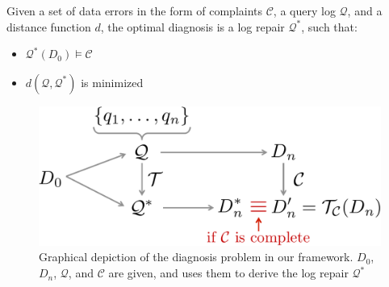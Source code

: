 \begin{definition}\label{def:problem}
    Given a set of data errors in the form of complaints $\mathcal{C}$, a query log $\mathcal{Q}$, and a distance function $d$, the optimal diagnosis is a log repair $\mathcal{Q}^*$, such that:
    \begin{itemize}[itemsep=0pt, parsep=0pt]
        \item $\mathcal{Q}^*(D_0)\models\mathcal{C}$
        \item $d(\mathcal{Q}, \mathcal{Q}^*)$ is minimized
    \end{itemize}
\end{definition}


\begin{figure}[t]
\centering
\includegraphics[width = 0.75\columnwidth]{figures/probtransform}
\caption{Graphical depiction of the diagnosis problem in our \sys framework.  $D_0$, $D_n$, $\mathcal{Q}$, and $\mathcal{C}$ are given, and \sys uses them to derive the log repair $\mathcal{Q}^*$}
\label{f:probtransform} 
\end{figure}


